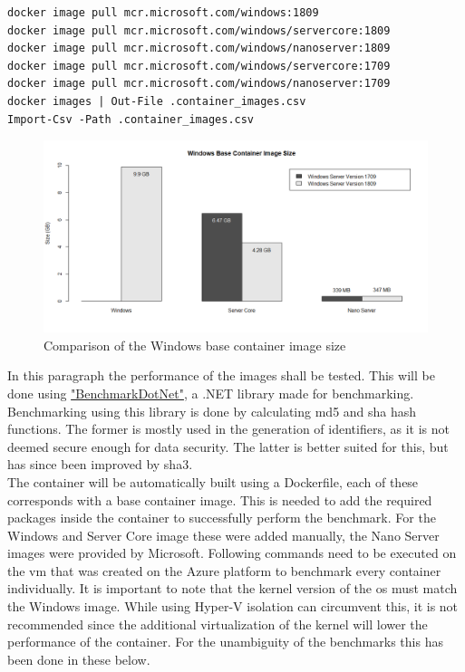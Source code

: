 \begin{lstlisting}[breaklines]
docker image pull mcr.microsoft.com/windows:1809
docker image pull mcr.microsoft.com/windows/servercore:1809
docker image pull mcr.microsoft.com/windows/nanoserver:1809  
docker image pull mcr.microsoft.com/windows/servercore:1709 
docker image pull mcr.microsoft.com/windows/nanoserver:1709   
docker images | Out-File .container_images.csv
Import-Csv -Path .container_images.csv
\end{lstlisting}

\begin{figure}[h]
	\captionsetup{width=0.8\linewidth}
	\includegraphics[width=0.9\linewidth]{img/Methodologie/Containers0.png}
	\centering
	\caption[Image size comparison]{Comparison of the Windows base container image size}
	\label{fig:Containers}	
\end{figure}

In this paragraph the performance of the images shall be tested. This will be done using \href{https://benchmarkdotnet.org/}{"BenchmarkDotNet"}, a .NET library made for benchmarking. \autocite{Akinshin2019} Benchmarking using this library is done by calculating \acrfull{md5} and \acrfull{sha} hash functions. The former is mostly used in the generation of identifiers, as it is not deemed secure enough for data security. The latter is better suited for this, but has since been improved by \acrfull{sha3}. \autocite{Enkov2017}
\\
The container will be automatically built using a Dockerfile, each of these corresponds with a base container image. This is needed to add the required packages inside the container to successfully perform the benchmark. For the Windows and Server Core image these were added manually, the Nano Server images were provided by Microsoft. Following commands need to be executed on the \acrshort{vm} that was created on the Azure platform to benchmark every container individually. It is important to note that the kernel version of the \acrshort{os} must match the Windows image. While using Hyper-V isolation can circumvent this, it is not recommended since the additional virtualization of the kernel will lower the performance of the container. For the unambiguity of the benchmarks this has been done in these below.

